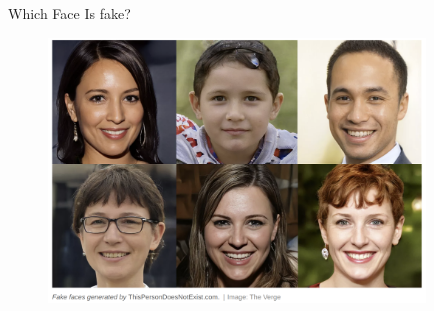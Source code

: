 \begin{frame} {Which Face Is fake?}

    \begin{figure}
    \centering
    \includegraphics[width=10cm]{plots/exampleGAN.png}
    \end{figure}

\end{frame}



%    
%



